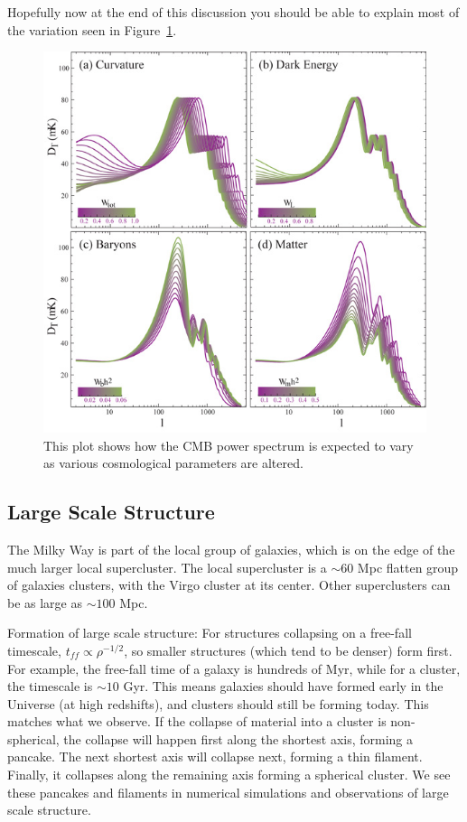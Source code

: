 Hopefully now at the end of this discussion you should be able to explain most of the variation
seen in Figure~\ref{fig:cmb_parameters}.

\begin{figure}[ht]
\centering
\includegraphics[width=\textwidth]{cosmology_cmb_parameters}
\caption{This plot shows how the CMB power spectrum is expected to vary as various cosmological
         parameters are altered.}
\label{fig:cmb_parameters}
\end{figure}

\subsection{Large Scale Structure}
The Milky Way is part of the local group of galaxies, which is on the edge 
of the much larger local supercluster.  The local supercluster is a $\sim60$ 
Mpc flatten group of galaxies clusters, with the Virgo cluster at its center.  
Other superclusters can be as large as $\sim100$ Mpc.  

Formation of large scale structure:\newline
For structures collapsing on a free-fall timescale, $t_{ff}\propto\rho^{-1/2}$, 
so smaller structures (which tend to be denser) form first.  For example, 
the free-fall time of a galaxy is hundreds of Myr, while for a cluster, the 
timescale is $\sim10$ Gyr.  This means galaxies should have formed early in the 
Universe (at high redshifts), and clusters should still be forming today.  This 
matches what we observe.  If the collapse of material into a cluster is 
non-spherical, the collapse will happen first along the shortest axis, forming 
a pancake.  The next shortest axis will collapse next, forming a thin 
filament.  Finally, it collapses along the remaining axis forming a spherical 
cluster.  We see these pancakes and filaments in numerical simulations and 
observations of large scale structure.  

